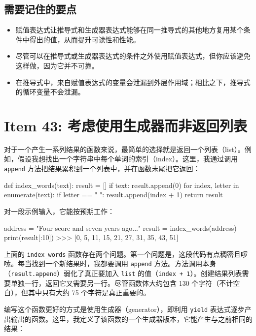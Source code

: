 \subsection{需要记住的要点}

\begin{itemize}
\item 赋值表达式让推导式和生成器表达式能够在同一推导式的其他地方复用某个条件中得出的值，从而提升可读性和性能。
\item 尽管可以在推导式或生成器表达式的条件之外使用赋值表达式，但你应该避免这样做，因为它并不可靠。
\item 在推导式中，来自赋值表达式的变量会泄漏到外层作用域；相比之下，推导式的循环变量不会泄漏。
\end{itemize}

\section{Item 43: 考虑使用生成器而非返回列表}

对于一个产生一系列结果的函数来说，最简单的选择就是返回一个列表（list）。例如，假设我想找出一个字符串中每个单词的索引（index）。这里，我通过调用 \texttt{append} 方法把结果累积到一个列表中，并在函数末尾把它返回：

\begin{codebox}[python]
def index_words(text):
    result = []
    if text:
        result.append(0)
    for index, letter in enumerate(text):
        if letter == " ":
            result.append(index + 1)
    return result
\end{codebox}

对一段示例输入，它能按预期工作：

\begin{codebox}[python]
address = "Four score and seven years ago..."
result = index_words(address)
print(result[:10])
>>>
[0, 5, 11, 15, 21, 27, 31, 35, 43, 51]
\end{codebox}

上面的 \texttt{index\_words} 函数存在两个问题。第一个问题是，这段代码有点稠密且啰嗦。每当找到一个新结果时，我都要调用 \texttt{append} 方法。方法调用本身（\texttt{result.append}）弱化了真正要加入 \texttt{list} 的值（\texttt{index + 1}）。创建结果列表需要单独一行，返回它又需要另一行。尽管函数体大约包含 130 个字符（不计空白），但其中只有大约 75 个字符是真正重要的。

编写这个函数更好的方式是使用生成器（generator），即利用 \texttt{yield} 表达式逐步产出输出的函数。这里，我定义了该函数的一个生成器版本，它能产生与之前相同的结果：

